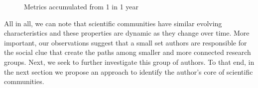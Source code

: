 \begin{figure}[!htb]
\begin{center}
{  }%
  \end{center}
  \caption{Metrics accumulated from 1 in 1 year}
  \label{fig:metrics_accumulated_1_in_1}
\end{figure}

All in all, we can note that scientific communities have similar evolving characteristics and these properties are dynamic as they change over time.  More important, our
observations suggest that a small set authors are responsible for the social clue that create the paths among smaller and more connected research groups. Next, we seek to further
investigate this group of authors. To that end, in the next section we propose an approach to identify the author's core of scientific communities.








